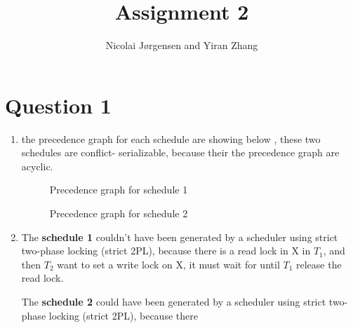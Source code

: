 \documentclass[11pt]{article}
\title          {Assignment 2}
\author         {Nicolai Jørgensen and Yiran Zhang}
\begin{document}
\maketitle
\newpage

\section{Question 1}

\begin{enumerate}
	\item
     the precedence graph for each schedule are showing below , these two schedules are conflict- 
     serializable, because their the precedence graph are acyclic.
		
		\begin{figure}[H]
			\centering

			\caption{Precedence graph for schedule 1} 
			\label{fig:trans-schedule-1} 
		\end{figure}

		\begin{figure}[H]
			\centering

			\caption{Precedence graph for schedule 2} 
			\label{fig:trans-schedule-1} 
		\end{figure}		
		
	\item
	The \textbf{schedule 1} couldn't have been generated by a scheduler using strict two-phase locking 
	(strict 2PL), because there is a read lock in X in $T_1$, and then $T_2$ want to set a write lock on 
	X, it must wait for until $T_1$ release the read lock.
	
	The \textbf{schedule 2} could have been generated by a scheduler using strict two-phase locking 
	(strict 2PL), because there	
		
		
\end{enumerate}
\end{document}
